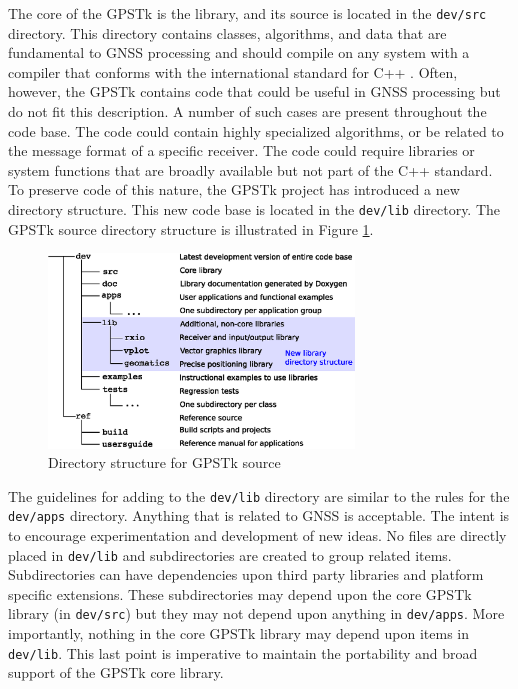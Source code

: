 \documentclass[letterpaper,ugly,10pt]{ion-gps}
\newcommand{\gpstkdir}[1]{\texttt{\mbox{#1}}}
\begin{document}
The core of the GPSTk is the library, and its source is located in the \gpstkdir{dev/src} directory. This directory contains classes, algorithms, and data that are fundamental to GNSS processing and should compile on any system with a compiler that conforms with the international standard for C++ \cite{iso-14882-2003}. Often, however, the GPSTk contains code that could be useful in GNSS processing but do not fit this description. A number of such cases are present throughout the code base. The code could contain highly specialized algorithms, or be related to the message format of a specific receiver. The code could require libraries or system functions that are broadly available but not part of the C++ standard. To preserve code of this nature, the GPSTk project has introduced a new directory structure. This new code base is located in the \gpstkdir{dev/lib} directory. The GPSTk source directory structure is illustrated in Figure \ref{fig:gpstkdevstructure}.
\begin{figure}
	\centering
	\includegraphics[width=3.2in,bb=91 373 500 634]{gpstk-directory-structures.eps}
	\caption{Directory structure for GPSTk source}
	\label{fig:gpstkdevstructure}
\end{figure}

The guidelines for adding to the \gpstkdir{dev/lib} directory are similar to the rules for the \gpstkdir{dev/apps} directory. Anything that is related to GNSS is acceptable. The intent is to encourage experimentation and development of new ideas. No files are directly placed in \gpstkdir{dev/lib} and subdirectories are created to group related items. Subdirectories can have dependencies upon third party libraries and platform specific extensions. These subdirectories may depend upon the core GPSTk library (in \gpstkdir{dev/src}) but they may not depend upon anything in \gpstkdir{dev/apps}. More importantly, nothing in the core GPSTk library may depend upon items in \gpstkdir{dev/lib}. This last point is imperative to maintain the portability and broad support of the GPSTk core library.
\end{document}
